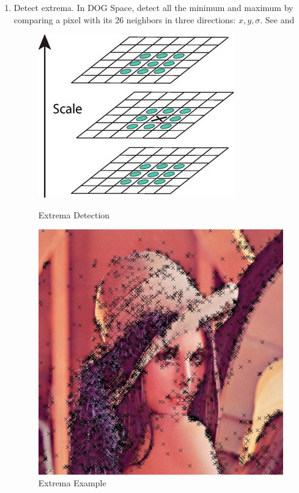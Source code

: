 \begin{enumerate}
  \item Detect extrema. In DOG Space, detect all the minimum and maximum
    by comparing a pixel with its 26 neighbors in three directions: $ x, y, \sigma$.
    See  and 
    \begin{figure}[H]
      \begin{minipage}[b]{0.46\linewidth}
        \centering
        \includegraphics[scale=0.4]{res/extrema.png}
        \caption{Extrema Detection\label{fig:extrema}}
      \end{minipage}
      \hspace{1em}
      \begin{minipage}[b]{0.46\linewidth}
        \centering
        \includegraphics[scale=0.4]{res/extrema_lenna.png}
        \caption{Extrema Example\label{fig:extrema2}}
      \end{minipage}
    \end{figure}


\end{enumerate}
